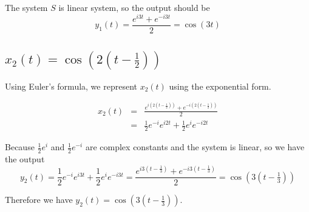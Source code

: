\documentclass[koma,a4paper,utopia,12pt,listings-color,microtype,paralist,colorlinks,urlcolor=red]{org-article}
\begin{document}
The system \(S\) is linear system, so the output should be
\begin{equation*}
y_{1}(t) = \frac{ e^{i3t} + e^{-i3t} }{2} = \cos(3t)
\end{equation*}

\subsection{\(x_{2}(t) = \cos(2(t-\frac{1}{2}))\)}
\label{sec:orgf4d37cf}



Using Euler's formula, we represent \(x_{2}(t)\) using the exponential form.

\begin{eqnarray*}
 x_{2}(t) &=& \frac{ e^{i(2(t-\frac{1}{2}))}  + e^{-i(2(t-\frac{1}{2}))} }{2} \\
&=& \frac{1}{2} e^{-i}e^{i2t} + \frac{1}{2}e^{i}e^{-i2t}
\end{eqnarray*}

Because \(\frac{1}{2}e^{i}\) and \(\frac{1}{2}e^{-i}\) are complex constants and
the system is linear, so we have the output
\begin{equation*}
y_{2}(t) = \frac{1}{2}e^{-i}e^{i3t} + \frac{1}{2}e^{i}e^{-i3t} = \frac{ e^{i3(t-\tfrac{1}{3})}  + e^{-i3(t-\tfrac{1}{3})}}{2} = \cos(3(t- \tfrac{1}{3}))
\end{equation*}

Therefore we have \(y_{2}(t) = \cos(3(t-\tfrac{1}{3}))\).
\end{document}
